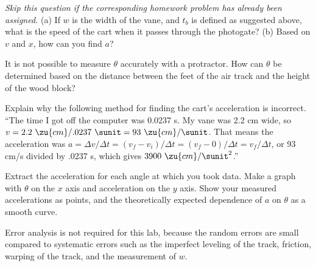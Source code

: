 \prelab

\prelabquestion   \emph{Skip this question if the corresponding homework problem
has already been assigned.} (a) If $w$ is the width of the vane, and $t_b$ is defined
as suggested above, what is the speed of the cart when it
passes through the photogate? 
(b) Based on $v$ and $x$, how can you find $a$?

\prelabquestion  It is not possible to measure $\theta $ accurately with
a protractor.  How can $\theta $ be determined based on the
distance between the feet of the air track and the
height of the wood block?

\prelabquestion  Explain why the following method for finding the cart's
acceleration is incorrect.  ``The time I got off the
computer was 0.0237 s.  My vane was 2.2 cm wide, so
$v=2.2\ \zu{cm}/.0237\ \sunit=93\ \zu{cm}/\sunit$.  That means the acceleration
was $a=\Delta v/\Delta t=(v_f-v_i)/\Delta t=(v_f-0)/\Delta t=v_f/\Delta t$, or
93 cm/s divided by .0237 s, which gives $3900\ \zu{cm}/\sunit^2$.''

\analysis

Extract the acceleration for each angle at which you took
data.  Make a graph with $\theta $ on the $x$ axis and
acceleration on the $y$ axis.  Show your measured accelerations
as points, and the theoretically expected dependence of $a$
on $\theta $ as a smooth curve.

Error analysis is not required for this lab, because the
random errors are small compared to systematic errors such
as the imperfect leveling of the track, friction,
warping of the track, and the measurement of $w$.
